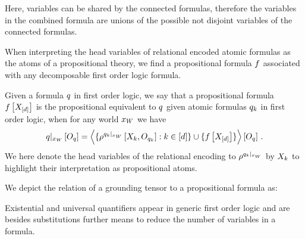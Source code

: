 Here, variables can be shared by the connected formulas, therefore the variables in the combined formula are unions of the possible not disjoint variables of the connected formulas.


When interpreting the head variables of relational encoded atomic formulas as the atoms of a propositional theory, we find a propositional formula $f$ associated with any decomposable first order logic formula.

\begin{definition}
    \label{def:propositionalEquivalent}
    Given a formula $q$ in first order logic, we say that a propositional formula $f\left[X_{[d]}\right]$ is the propositional equivalent to $q$ given atomic formulas $q_{k}$ in first order logic, when for any world $x_{W}$ we have
    \begin{align*}
        {q}|_{x_{W}} \left[O_{q}\right]
        = \left\langle 
            \{\rho^{{q_{k}}|_{x_{W}}}\left[X_{k},O_{q_{k}}\right] : k\in[d]\}
            \cup \{f\left[X_{[d]}\right]\}
        \right\rangle \left[ O_{q} \right] \, .
    \end{align*}
    We here denote the head variables of the relational encoding to $\rho^{{q_{k}}|_{x_{W}}}$ by $X_{k}$ to highlight their interpretation as propositional atoms.
\end{definition}

We depict the relation of a grounding tensor to a propositional formula as:
\begin{center}
    
\end{center}



Existential and universal quantifiers appear in generic first order logic and are besides substitutions further means to reduce the number of variables in a formula.


